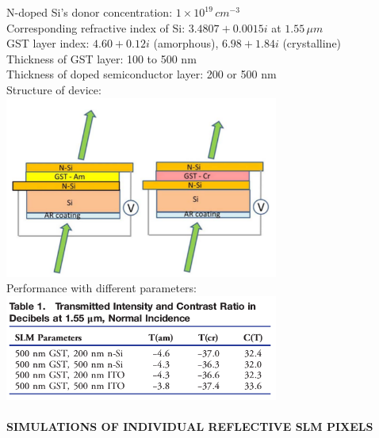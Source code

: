 \documentclass[]{article}
\let\oldparagraph\paragraph
\renewcommand{\paragraph}[1]{\oldparagraph{#1}\mbox{}}
\begin{document}
N-doped Si's donor concentration: \(1 \times 10^{19} \,cm^{-3}\)\\
Corresponding refractive index of Si: \(3.4807 + 0.0015i\) at
\(1.55\,\mu m\)\\
GST layer index: \(4.60 + 0.12i\) (amorphous), \(6.98 + 1.84i\)
(crystalline)\\
Thickness of GST layer: 100 to 500 nm\\
Thickness of doped semiconductor layer: 200 or 500 nm\\
\newpage
Structure of device:\\
\includegraphics[width = 9cm]{image/002_01.png}\\
Performance with different parameters:\\
\includegraphics[width = 9cm]{image/002_02.png}

\paragraph{SIMULATIONS OF INDIVIDUAL REFLECTIVE SLM
PIXELS}\label{simulations-of-individual-reflective-slm-pixels}
\end{document}
